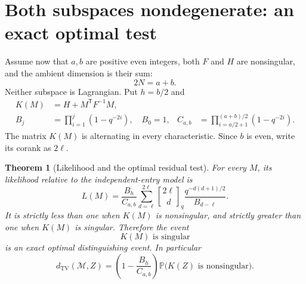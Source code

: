 \documentclass[11pt]{article}
\numberwithin{equation}{section}
\newtheorem{theorem}{Theorem}[section]
\theoremstyle{definition}
\theoremstyle{remark}
\newcommand{\Prob}{\mathbb P}
\newcommand{\TV}{d_{\mathrm{TV}}}
\newcommand{\tr}{\mathsf T}
\newcommand{\qbin}[2]{\genfrac{[}{]}{0pt}{}{#1}{#2}_{q}}
\begin{document}
\section{Both subspaces nondegenerate: an exact optimal test}
\label{sec:boundary}
Assume now that $a,b$ are positive even integers, both $F$ and $H$ are nonsingular, and the ambient dimension is their sum:
\begin{equation}\label{eq:boundarysetup}
 2N=a+b.
\end{equation}
Neither subspace is Lagrangian. Put $h=b/2$ and
\begin{align}
 K(M)&=H+M^\tr F^{-1}M,\label{eq:K}\\
 B_j&=\prod_{i=1}^j(1-q^{-2i}),\quad B_0=1,
 &C_{a,b}&=\prod_{i=a/2+1}^{(a+b)/2}(1-q^{-2i}).\label{eq:BC}
\end{align}
The matrix $K(M)$ is alternating in every characteristic. Since $b$ is even, write its corank as $2\ell$.

\begin{theorem}[Likelihood and the optimal residual test]\label{thm:boundary}
For every $M$, its likelihood relative to the independent-entry model is
\begin{equation}\label{eq:boundarylikelihood}
 L(M)=\frac{B_h}{C_{a,b}}
 \sum_{d=\ell}^{2\ell}
 \qbin{2\ell}d\frac{q^{-d(d+1)/2}}{B_{d-\ell}}.
\end{equation}
It is strictly less than one when $K(M)$ is nonsingular, and strictly greater than one when $K(M)$ is singular. Therefore the event
\begin{equation}\label{eq:optimaltest}
 \boxed{K(M)\text{ is singular}}
\end{equation}
is an exact optimal distinguishing event. In particular
\begin{equation}\label{eq:boundaryTV}
 \boxed{\displaystyle
 \TV(\mathcal M,Z)=
 \left(1-\frac{B_h}{C_{a,b}}\right)
 \Prob\bigl(K(Z)\text{ is nonsingular}\bigr).}
\end{equation}
\end{theorem}
\end{document}
